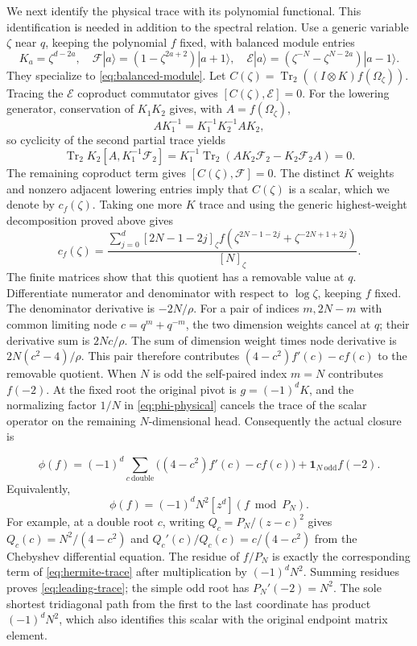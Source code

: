\documentclass[11pt]{article}
\numberwithin{equation}{section}
\theoremstyle{definition}\newtheorem{definition}[theorem]{Definition}
\theoremstyle{remark}\newtheorem{remark}[theorem]{Remark}
\begin{document}
We next identify the physical trace with its polynomial functional.
This identification is needed in addition to the spectral relation.
Use a generic variable $\zeta$ near $q$, keeping the polynomial $f$
fixed, with balanced module entries
\[
 K_a=\zeta^{d-2a},\quad
 \mathcal F|a\rangle=(1-\zeta^{2a+2})|a+1\rangle,\quad
 \mathcal E|a\rangle=(\zeta^{-N}-\zeta^{N-2a})|a-1\rangle.
\]
They specialize to \eqref{eq:balanced-module}. Let
$C(\zeta)=\operatorname{Tr}_2((I\otimes K)f(\Omega_\zeta))$.
Tracing the $\mathcal E$ coproduct commutator gives
$[C(\zeta),\mathcal E]=0$. For the lowering generator, conservation
of $K_1K_2$ gives, with $A=f(\Omega_\zeta)$,
\[
 A K_1^{-1}=K_1^{-1}K_2^{-1} A K_2,
\]
so cyclicity of the second partial trace yields
\[
 \operatorname{Tr}_2 K_2[A,K_1^{-1}\mathcal F_2]
 =K_1^{-1}\operatorname{Tr}_2
       (A K_2\mathcal F_2-K_2\mathcal F_2 A)=0.
\]
The remaining coproduct term gives $[C(\zeta),\mathcal F]=0$.
The distinct $K$ weights and nonzero adjacent lowering entries imply
that $C(\zeta)$ is a scalar, which we denote by $c_f(\zeta)$.
Taking one more $K$ trace and using the generic highest-weight
decomposition proved above gives
\begin{equation}\label{nt:generic-trace}
 c_f(\zeta)=
 \frac{\displaystyle\sum_{j=0}^{d}[2N-1-2j]_\zeta
 f(\zeta^{2N-1-2j}+\zeta^{-2N+1+2j})}{[N]_\zeta}.
\end{equation}
The finite matrices show that this quotient has a removable value at
$q$. Differentiate numerator and denominator with respect to
$\log\zeta$, keeping $f$ fixed. The denominator derivative is
$-2N/\rho$. For a pair of indices $m,2N-m$ with common limiting
node $c=q^m+q^{-m}$, the two dimension weights cancel at $q$;
their derivative sum is $2Nc/\rho$. The sum of dimension weight
times node derivative is $2N(c^2-4)/\rho$. This pair therefore
contributes $(4-c^2)f'(c)-cf(c)$ to the removable quotient.
When $N$ is odd the self-paired index $m=N$ contributes $f(-2)$.
At the fixed root the original pivot is $g=(-1)^dK$, and the
normalizing factor $1/N$ in \eqref{eq:phi-physical} cancels the
trace of the scalar operator on the remaining $N$-dimensional head.
Consequently the actual closure is

\begin{equation}\label{eq:hermite-trace}
 \phi(f)=(-1)^d\sum_{c\ \mathrm{double}}
 \bigl((4-c^2)f'(c)-cf(c)\bigr)
 +\mathbf1_{N\ \mathrm{odd}}f(-2).
\end{equation}
Equivalently,
\begin{equation}\label{eq:leading-trace}
 \phi(f)=(-1)^dN^2[z^d](f\bmod P_N).
\end{equation}
For example, at a double root $c$, writing $Q_c=P_N/(z-c)^2$ gives
$Q_c(c)=N^2/(4-c^2)$ and $Q_c'(c)/Q_c(c)=c/(4-c^2)$ from the Chebyshev differential equation. The residue of $f/P_N$ is exactly the corresponding term of \eqref{eq:hermite-trace} after multiplication by $(-1)^dN^2$. Summing residues proves \eqref{eq:leading-trace}; the simple odd root has $P_N'(-2)=N^2$. The sole shortest tridiagonal path from the first to the last coordinate has product $(-1)^dN^2$, which also identifies this scalar with the original endpoint matrix element.
\end{document}
